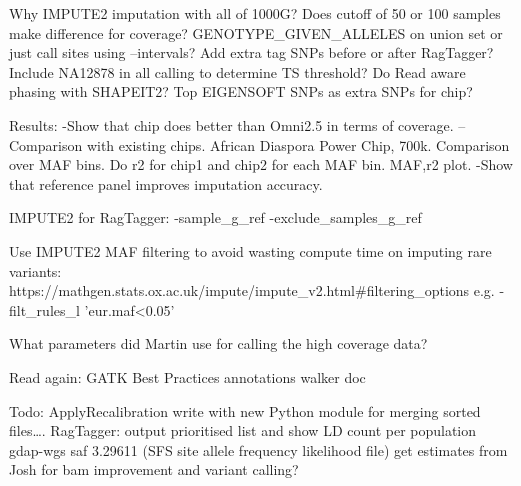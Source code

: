 Why IMPUTE2 imputation with all of 1000G?
Does cutoff of 50 or 100 samples make difference for coverage?
GENOTYPE_GIVEN_ALLELES on union set or just call sites using --intervals?
Add extra tag SNPs before or after RagTagger?
Include NA12878 in all calling to determine TS threshold?
Do Read aware phasing with SHAPEIT2?
Top EIGENSOFT SNPs as extra SNPs for chip?

Results:
-Show that chip does better than Omni2.5 in terms of coverage.
--Comparison with existing chips. African Diaspora Power Chip, 700k. Comparison over MAF bins. Do r2 for chip1 and chip2 for each MAF bin. MAF,r2 plot.
-Show that reference panel improves imputation accuracy.


IMPUTE2 for RagTagger:
-sample_g_ref
-exclude_samples_g_ref

Use IMPUTE2 MAF filtering to avoid wasting compute time on imputing rare variants:
https://mathgen.stats.ox.ac.uk/impute/impute_v2.html#filtering_options
e.g. -filt_rules_l 'eur.maf<0.05’


What parameters did Martin use for calling the high coverage data?


Read again:
GATK Best Practices
annotations
walker doc


Todo:
ApplyRecalibration write with new Python module for merging sorted files….
RagTagger: output prioritised list and show LD count per population
gdap-wgs saf 3.29611 (SFS site allele frequency likelihood file)
get estimates from Josh for bam improvement and variant calling?
